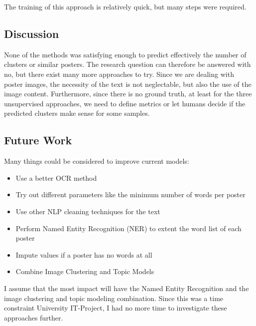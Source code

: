 \documentclass[conference]{IEEEtran}
\begin{document}
The training of this approach is relatively quick, but many steps were required. 

\subsection{Discussion}

None of the methods was satisfying enough to predict effectively the number of clusters or similar posters. The research question can therefore be answered with no, but there exist many more approaches to try. Since we are dealing with poster images, the necessity of the text is not neglectable, but also the use of the image content. Furthermore, since there is no ground truth, at least for the three unsupervised approaches, we need to define metrics or let humans decide if the predicted clusters make sense for some samples. 

\subsection{Future Work}

Many things could be considered to improve current models:

\begin{itemize}
\item Use a better OCR method
\item Try out different parameters like the minimum number of words per poster
\item Use other NLP cleaning techniques for the text
\item Perform Named Entity Recognition (NER) to extent the word list of each poster
\item Impute values if a poster has no words at all
\item Combine Image Clustering and Topic Models
\end{itemize}

I assume that the most impact will have the Named Entity Recognition and the image clustering and topic modeling combination. Since this was a time constraint University IT-Project, I had no more time to investigate these approaches further.

\renewcommand{\refname}{References}

\end{document}
